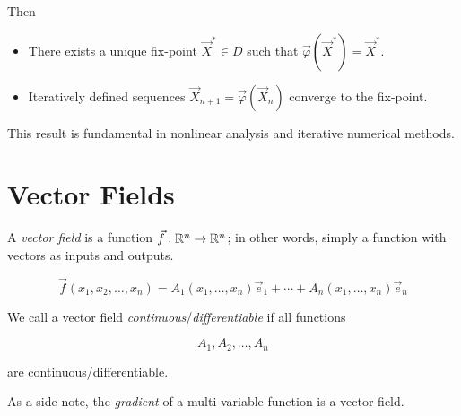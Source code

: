 Then

\begin{itemize}

    \item There exists a unique fix-point \( \vec{X}^* \in D \) such that 
    \( \vec{\varphi}(\vec{X}^*) = \vec{X}^* \).

    \item Iteratively defined sequences \( \vec{X}_{n+1} = \vec{\varphi}(\vec{X}_n) \) converge to the 
    fix-point.

\end{itemize}

This result is fundamental in nonlinear analysis and iterative numerical methods.

\section{Vector Fields}

A \emph{vector field} is a function \(\vec{f}: \mathbb{R}^n \to \mathbb{R}^n\); in other words, simply a 
function with vectors as inputs and outputs.

\[
    \vec{f}(x_1, x_2, \dots, x_n) = A_1(x_1, \dots, x_n)\vec{e}_1 + \cdots + A_n(x_1, \dots, x_n)\vec{e}_n
\]

We call a vector field \emph{continuous}/\emph{differentiable} if all functions 

\[
    A_1, A_2, \dots, A_n
\] 

are continuous/differentiable.

As a side note, the \emph{gradient} of a multi-variable function is a vector field.

